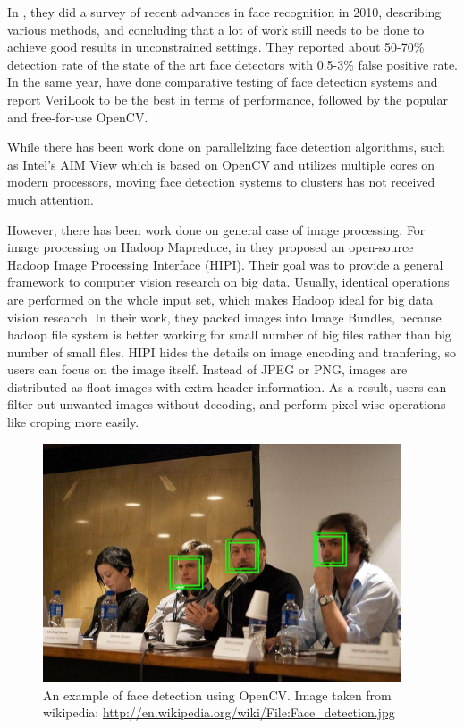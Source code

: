 \documentclass[11pt, draftclsnofoot, onecolumn]{IEEEtran}
\begin{document}
In \cite{MSR2010}, they did a survey of recent advances in face recognition in 2010, describing various methods, and concluding that a lot of work still needs to be done to achieve good results in unconstrained settings. They reported about 50-70\% detection rate of the state of the art face detectors with 0.5-3\% false positive rate. In the same year, \cite{TSU2010} have done comparative testing of face detection systems and report VeriLook to be the best in terms of performance, followed by the popular and free-for-use OpenCV.

While there has been work done on parallelizing face detection algorithms, such as Intel's AIM View \cite{IC2012} which is based on OpenCV and utilizes multiple cores on modern processors, moving face detection systems to clusters has not received much attention.

However, there has been work done on general case of image processing. For image processing on Hadoop Mapreduce, in \cite{sweeney2011hipi} they proposed an open-source Hadoop Image Processing Interface (HIPI). Their goal was to provide a general framework to computer vision research on big data. Usually, identical operations are performed on the whole input set, which makes Hadoop ideal for big data vision research. In their work, they packed images into Image Bundles, because hadoop file system is better working for small number of big files rather than big number of small files\cite{sweeney2011hipi}. HIPI hides the details on image encoding and tranfering, so users can focus on the image itself. Instead of JPEG or PNG, images are distributed as float images with extra header information. As a result, users can filter out unwanted images without decoding, and perform pixel-wise operations like croping more easily.

\begin{figure}[t]
\centering
\includegraphics[width=300pt]{img2}
\caption{An example of face detection using OpenCV. Image taken from wikipedia: \url{http://en.wikipedia.org/wiki/File:Face_detection.jpg}}
\end{figure}
\end{document}
